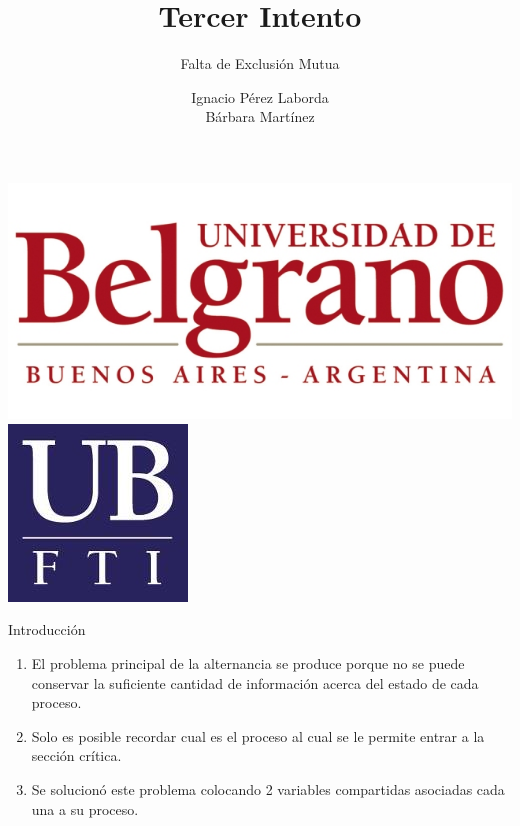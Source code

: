 \documentclass{beamer}
\title[Tecnologia]
{Tercer Intento}
\subtitle{Falta de Exclusión Mutua}
\author[Grupo 3] 
{Ignacio P\'erez Laborda\\B\'arbara Mart\'inez}
\institute[UB--FTI] 
{
  Facultad de Tecnolog\'ia Inform\'atica\\
  Universidad de Belgrano
}
\date[\today]
\begin{document}
\begin{frame}

\includegraphics[height=0.2\textheight]{ub2.jpg} \hspace*{6cm}
\includegraphics[height=0.19\textheight]{FTI.jpg}  
\\[-0.1cm]
\titlepage


\end{frame}

\begin{frame}{Introducción}

\begin{enumerate}[$*$]
\item El problema principal de la alternancia se produce porque no se puede conservar la suficiente 
cantidad 
de información acerca del estado de cada proceso.
\item  Solo es posible recordar cual es el proceso al cual se le permite entrar a la sección 
crítica.
\item  Se solucionó este problema colocando 2 variables compartidas asociadas cada una a su proceso.
\end{enumerate}

\end{frame}
\end{document}
